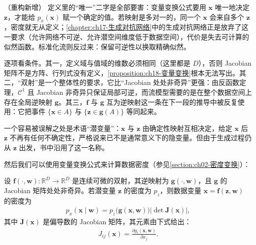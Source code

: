 \documentclass[../main.tex]{subfiles}
\begin{document}
\begin{remark}（重构新增）
定义里的“唯一”二字是全部要害：变量变换公式要用 $\bm{x}$ 唯一地决定 $\bm{z}$，才能给 $p_x(\bm{x})$ 赋一个确定的值。若映射是多对一的，同一个 $\bm{x}$ 会来自多个 $\bm{z}$，密度就无从定义；\cref{chapter:ch17-生成对抗网络}中的生成对抗网络正是放弃了这一要求（允许网络不可逆、允许潜空间维度低于数据空间），代价是失去可计算的似然函数。标准化流则反过来：保留可逆性以换取精确似然。

逐项看条件。其一，定义域与值域的维数必须相同（这里都是 $D$），否则 Jacobian 矩阵不是方阵、行列式没有定义，\cref{proposition:ch18-变量变换}根本无法写出。其二，“双射”是一个整体性的要求，它比“Jacobian 处处非奇异”更强：由反函数定理，$\mathcal{C}^{1}$ 且 Jacobian 非奇异只保证局部可逆，而流模型需要的是在整个数据空间上存在全局逆映射 $\bm{g}$。其三，$\bm{f}$ 与 $\bm{g}$ 互为逆映射这一条在下一段的推导中被反复使用：它把事件 $\{\bm{x}\in A\}$ 与 $\{\bm{z}\in\bm{g}(A)\}$ 等同起来。

一个容易被误解之处是术语“潜变量”：$\bm{x}$ 与 $\bm{z}$ 由确定性映射互相决定，给定 $\bm{x}$ 后 $\bm{z}$ 不再有任何不确定性，严格说来已不是通常意义下的隐变量。但由于生成过程仍从 $\bm{z}$ 出发，书中沿用了这一名称。
\end{remark}

然后我们可以使用变量变换公式来计算数据密度（参见\cref{section:ch02-密度变换}）：

\begin{proposition}[变量变换公式]\label{proposition:ch18-变量变换}
设 $\bm{f}(\cdot,\bm{w}):\mathbb{R}^{D}\rightarrow\mathbb{R}^{D}$ 是连续可微的双射，其逆映射为 $\bm{g}(\cdot,\bm{w})$，且 $\bm{g}$ 的 Jacobian 矩阵处处非奇异。若潜变量 $\bm{z}$ 的密度为 $p_z$，则数据变量 $\bm{x}=\bm{f}(\bm{z},\bm{w})$ 的密度为
\begin{align}
  p_x(\bm{x}\mid\bm{w})=p_z\big(\bm{g}(\bm{x},\bm{w})\big)\left|\det\bm{J}(\bm{x})\right|,
  \label{align:ch18-change-var}
\end{align}
其中 $\bm{J}(\bm{x})$ 是偏导数的 Jacobian 矩阵，其元素由下式给出：
\begin{align}
  J_{ij}(\bm{x})=\frac{\partial g_i(\bm{x},\bm{w})}{\partial x_j}.
  \label{align:ch18-Jacobian元素}
\end{align}
\end{proposition}
\end{document}
